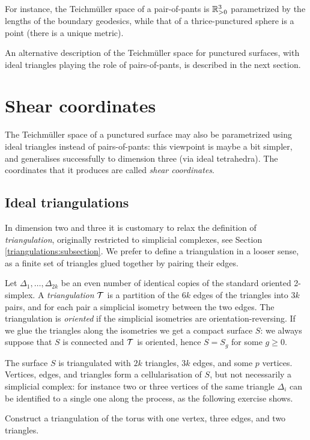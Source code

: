 For instance, the Teichm\"uller space of a pair-of-pants is $\mathbb{R}_{>0}^3$ parametrized by the lengths of the boundary geodesics, while that of a thrice-punctured sphere is a point (there is a unique metric).

An alternative description of the Teichm\"uller space for punctured surfaces, with ideal triangles playing the role of pairs-of-pants, is described in the next section.

\section{Shear coordinates}
The Teichm\"uller space of a punctured surface may also be parametrized using ideal triangles instead of pairs-of-pants: this viewpoint is maybe a bit simpler, and generalises successfully to dimension three (via ideal tetrahedra). The coordinates that it produces are called \emph{shear coordinates}.

\subsection{Ideal triangulations}
In dimension two and three it is customary to relax the definition of \emph{triangulation}, originally restricted to simplicial complexes, see Section \ref{triangulations:subsection}. We prefer to define a triangulation in a looser sense, as a finite set of triangles glued together by pairing their edges. 

Let $\Delta_1,\ldots, \Delta_{2k}$ be an even number of identical copies of the standard oriented 2-simplex. A \emph{triangulation} $\mathcal{T}$ is a partition of the $6k$ edges of the triangles into $3k$ pairs, and for each pair a simplicial isometry between the two edges. The triangulation is \emph{oriented} if the simplicial isometries are orientation-reversing. If we glue the triangles along the isometries we get a compact surface $S$: we always suppose that $S$ is connected and $\mathcal{T}$ is oriented, hence $S = S_g$ for some $g\geqslant 0$.

The surface $S$ is triangulated with $2k$ triangles, $3k$ edges, and some $p$ vertices. Vertices, edges, and triangles form a cellularisation of $S$, but not necessarily a simplicial complex: for instance two or three vertices of the same triangle $\Delta_i$ can be identified to a single one along the process, as the following exercise shows.

\begin{ex}
Construct a triangulation of the torus with one vertex, three edges, and two triangles.
\end{ex}

